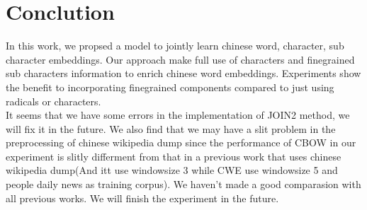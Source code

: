 \section{Conclution}
In this work, we propsed a model to jointly learn chinese word, character, sub character embeddings. Our approach make full use of characters and finegrained sub characters information to enrich chinese word embeddings. Experiments show the benefit to incorporating finegrained components compared to just using radicals or characters. \\

It seems that we have some errors in the implementation of JOIN2 method, we will fix it in the future. We also find that we may have a slit problem in the preprocessing of chinese wikipedia dump since the performance of CBOW in our experiment is slitly differment from that in a previous work that uses chinese wikipedia dump(And itt use windowsize 3 while CWE use windowsize 5 and people daily news as training corpus). We haven't made a good comparasion with all previous works. We will finish the experiment in the future.
